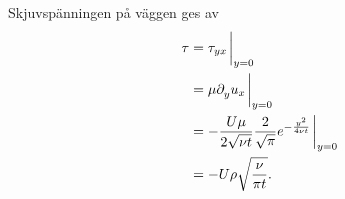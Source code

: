 Skjuvspänningen på väggen ges av
\begin{align*}
	\tau &= \tau_{yx}\eval_{y = 0} \\
	     &= \mu\del{y}{u_{x}}\eval_{y = 0} \\
	     &= -\frac{U\mu}{2\sqrt{\nu t}}\frac{2}{\sqrt{\pi}}e^{-\frac{y^{2}}{4\nu t}}\eval_{y = 0} \\
	     &= -U\rho\sqrt{\frac{\nu}{\pi t}}.
\end{align*}